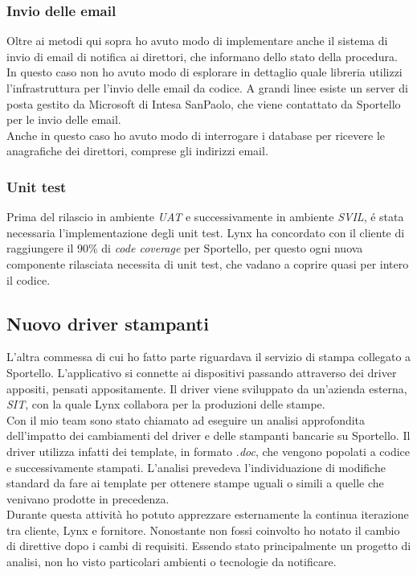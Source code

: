 \subsubsection{Invio delle email}
Oltre ai metodi qui sopra ho avuto modo di implementare anche il sistema di invio di email di notifica ai direttori, che informano dello stato della procedura. \\
In questo caso non ho avuto modo di esplorare in dettaglio quale libreria utilizzi l'infrastruttura per l'invio delle email da codice. A grandi linee esiste un server di posta gestito da Microsoft di Intesa SanPaolo, che viene contattato da Sportello per le invio delle email. \\
Anche in questo caso ho avuto modo di interrogare i database per ricevere le anagrafiche dei direttori, comprese gli indirizzi email. 

\subsubsection{Unit test}
Prima del rilascio in ambiente \textit{UAT} e successivamente in ambiente \textit{SVIL}, é stata necessaria l'implementazione degli unit test. Lynx ha concordato con il cliente di raggiungere il 90\% di \textit{code coverage} per Sportello, per questo ogni nuova componente rilasciata necessita di unit test, che vadano a coprire quasi per intero il codice.

\subsection{Nuovo driver stampanti}
L'altra commessa di cui ho fatto parte riguardava il servizio di stampa collegato a Sportello. L'applicativo si connette ai dispositivi passando attraverso dei driver appositi, pensati appositamente. Il driver viene sviluppato da un'azienda esterna, \textit{SIT}, con la quale Lynx collabora per la produzioni delle stampe. \\
Con il mio team sono stato chiamato ad eseguire un analisi approfondita dell'impatto dei cambiamenti del driver e delle stampanti bancarie su Sportello. Il driver utilizza infatti dei template, in formato \textit{.doc}, che vengono popolati a codice e successivamente stampati. L'analisi prevedeva l'individuazione di modifiche standard da fare ai template per ottenere stampe uguali o simili a quelle che venivano prodotte in precedenza. \\
Durante questa attività ho potuto apprezzare esternamente la continua iterazione tra cliente, Lynx e fornitore. Nonostante non fossi coinvolto ho notato il cambio di direttive dopo i cambi di requisiti. Essendo stato principalmente un progetto di analisi, non ho visto particolari ambienti o tecnologie da notificare. 